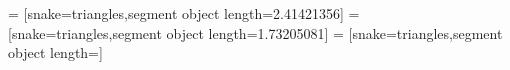 \def\tikz@snake@install@trans{\pgfsetsnakesegmenttransformation{\pgf@snake@mirror\pgf@snake@raise}}

\def\tikz@snake{zigzag}

\let\tikz@presnake=\pgfutil@empty
\let\tikz@postsnake=\pgfutil@empty
\def\tikz@mainsnakelength{\pgfsnakeremainingdistance}


=      [snake=triangles,segment object length=2.41421356\pgfsnakesegmentamplitude]
=      [snake=triangles,segment object length=1.73205081\pgfsnakesegmentamplitude]
=      [snake=triangles,segment object length=\pgfsnakesegmentamplitude]



\endinput
